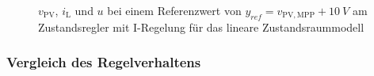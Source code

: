 \begin{figure}[H]
    \centering
    \caption[Validierung Regler mit I-Regelung (linear)]{$v_{\mathrm{PV}}$, $i_{\mathrm{L}}$ und $u$ bei einem Referenzwert von $y_{ref} = v_{\mathrm{PV,MPP}} + \SI{10}{V}$ am Zustandsregler mit I-Regelung für das lineare Zustandsraummodell}
    \label{fig:Bild18}
\end{figure}

\subsubsection{Vergleich des Regelverhaltens}

